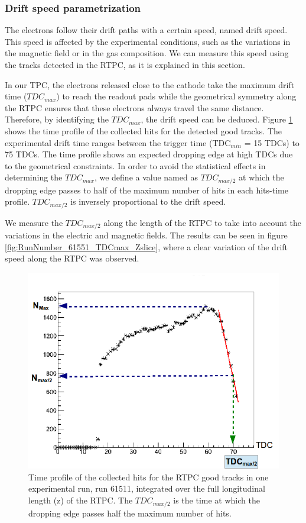\subsubsection{Drift speed parametrization}
The electrons follow their drift paths with a certain speed, named drift 
speed. This speed is affected by the experimental conditions, such as the 
variations in the magnetic field or in the gas composition. We can measure this 
speed using the tracks detected in the RTPC, as it is explained in this 
section.


In our TPC, the electrons released close to the cathode take the maximum drift 
time ($TDC_{max}$) to reach the readout pads while the geometrical symmetry 
along the RTPC ensures that these electrons always travel the same distance.  
Therefore, by identifying the $TDC_{max}$, the drift speed can be deduced.  
Figure \ref{fig:TDC_profile} shows the time profile of the collected hits for 
the detected good tracks. The experimental drift time ranges between the 
trigger time (TDC$_{min}$ = 15 TDCs) to 75 TDCs. The time profile shows an 
expected dropping edge at high TDCs due to the geometrical constraints. In 
order to avoid the statistical effects in determining the  $TDC_{max}$, we 
define a value named as $TDC_{max/2}$ at which the dropping edge passes to half 
of the maximum number of hits in each hits-time profile. $TDC_{max/2}$ is 
inversely proportional to the drift speed.
 

We measure the $TDC_{max/2}$ along the length of the RTPC to take into account 
the variations in the electric and magnetic fields. The results can be seen in 
figure \ref{fig:RunNumber_61551_TDCmax_Zslice}, where a clear variation of the 
drift speed along the RTPC was observed.  

\begin{figure}[tbp]
\centering
\vspace{-0.1in}
\includegraphics[scale=0.35]{fig_rtpc/TDC_profile.png}
\caption{Time profile of the collected hits for the RTPC good tracks in one 
   experimental run, run 61511, integrated over the full longitudinal length 
(z) of the RTPC. The $TDC_{max/2}$ is the time at which the dropping edge 
passes half the maximum number of hits.}
\label{fig:TDC_profile}
\end{figure} 

